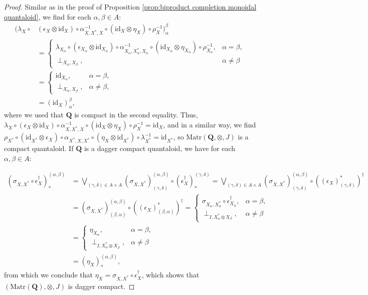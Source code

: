 \documentclass[12pt]{tac}
\theoremstyle{definition}
\theoremstyle{remark}
\newcommand{\<}{\langle}
\renewcommand{\>}{\rangle}
\renewcommand{\:}{\colon}
\newcommand{\id}{\mathrm{id}}
\begin{document}
\begin{proof}
Similar as in the proof of Proposition \ref{prop:biproduct completion monoidal quantaloid}, we find for each $\alpha,\beta\in A$:
    \begin{align*}
        (\lambda_X\circ & (\epsilon_X\otimes\id_X)\circ\alpha_{X,X^*,X}^{-1}\circ(\id_X\otimes\eta_X)\circ\rho_X^{-1})_\alpha^\beta \\
        & = \begin{cases}
        \lambda_{X_\alpha}\circ(\epsilon_{X_\alpha}\otimes\id_{X_\alpha})\circ\alpha_{{X_\alpha},X_\alpha^*,{X_\alpha}}^{-1}\circ(\id_{X_\alpha}\otimes\eta_{X_\alpha})\circ\rho_{X_\alpha}^{-1}, & \alpha=\beta,\\
        \perp_{X_\alpha,X_\beta}, & \alpha\neq\beta
        \end{cases}\\
        & = \begin{cases}
            \id_{X_\alpha}, & \alpha=\beta,
        \\
        \perp_{X_\alpha,X_\beta}, & \alpha\neq\beta,
        \end{cases}\\
        & = (\id_X)_\alpha^\beta,
    \end{align*}
    where we used that $\mathbf Q$ is compact in the second equality. Thus,
    $\lambda_X\circ
    (\epsilon_X\otimes\id_X)\circ\alpha_{X,X^*,X}^{-1}\circ(\id_X\otimes\eta_X)\circ\rho_X^{-1}=\id_X$,
    and in a similar way, we find
    $\rho_{X^*}\circ(\id_{X^*}\otimes\epsilon_X)\circ\alpha_{X^*,X,X^*}\circ(\eta_X\otimes\id_{X^*})\circ\lambda_{X^*}^{-1}=\id_{X^*}$,
    so $\mathrm{Matr}(\mathbf Q,\otimes,J)$ is a compact quantaloid. If $\mathbf Q$
    is a dagger compact quantaloid, we have for each $\alpha,\beta\in A$:

\begin{align*}
(\sigma_{X,X^*}\circ\epsilon_X^\dag)_*^{(\alpha,\beta)} & = \bigvee_{(\gamma,\delta)\in A\times A}(\sigma_{X,X^*})^{(\alpha,\beta)}_{(\gamma,\delta)}\circ (\epsilon_X^\dag)_*^{(\gamma,\delta)}
     =  \bigvee_{(\gamma,\delta)\in A\times A}(\sigma_{X,X^*})^{(\alpha,\beta)}_{(\gamma,\delta)}\circ ((\epsilon_X)^*_{(\gamma,\delta)})^\dag\\
    & = (\sigma_{X,X^*})^{(\alpha,\beta)}_{(\beta,\alpha)}\circ ((\epsilon_X)^*_{(\beta,\alpha)})^\dag= \begin{cases}
        \sigma_{X_\alpha,X_\alpha^*}\circ \epsilon_{X_\alpha}^\dag, & \alpha=\beta,\\
        \perp_{I,X_\alpha^*\otimes X_\beta}, & \alpha\neq\beta
    \end{cases}\\
    & = \begin{cases}
        \eta_{X_\alpha}, & \alpha=\beta,\\
    \perp_{I,X_\alpha^*\otimes X_\beta}, & \alpha\neq\beta
        \end{cases}\\
        & = (\eta_X)_*^{(\alpha,\beta)},
\end{align*}
from which we conclude that $\eta_X=\sigma_{X,X^*}\circ\epsilon_X^\dag$, which shows that $(\mathrm{Matr}(\mathbf Q),\otimes,J)$ is dagger compact. 
\end{proof}
\end{document}
